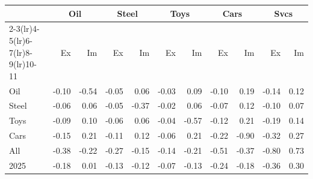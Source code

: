\begin{tabular}{lrrrrrrrrrr}
\toprule
 & \multicolumn{2}{c}{Oil} & \multicolumn{2}{c}{Steel} & \multicolumn{2}{c}{Toys} & \multicolumn{2}{c}{Cars} & \multicolumn{2}{c}{Svcs} \\
\cmidrule(lr){2-3}\cmidrule(lr){4-5}\cmidrule(lr){6-7}\cmidrule(lr){8-9}\cmidrule(lr){10-11}
 & Ex & Im & Ex & Im & Ex & Im & Ex & Im & Ex & Im \\
\midrule
Oil & -0.10 & -0.54 & -0.05 & 0.06 & -0.03 & 0.09 & -0.10 & 0.19 & -0.14 & 0.12 \\
Steel & -0.06 & 0.06 & -0.05 & -0.37 & -0.02 & 0.06 & -0.07 & 0.12 & -0.10 & 0.07 \\
Toys & -0.09 & 0.10 & -0.06 & 0.06 & -0.04 & -0.57 & -0.12 & 0.21 & -0.19 & 0.14 \\
Cars & -0.15 & 0.21 & -0.11 & 0.12 & -0.06 & 0.21 & -0.22 & -0.90 & -0.32 & 0.27 \\
All & -0.38 & -0.22 & -0.27 & -0.15 & -0.14 & -0.21 & -0.51 & -0.37 & -0.80 & 0.73 \\
2025 & -0.18 & 0.01 & -0.13 & -0.12 & -0.07 & -0.13 & -0.24 & -0.18 & -0.36 & 0.30 \\
\bottomrule
\end{tabular}
